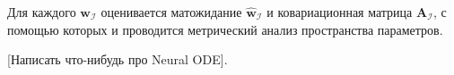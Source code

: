 \documentclass[12pt, twoside]{article}
\begin{document}
Для каждого $\mathbf{w}_{\mathcal{I}}$ оценивается матожидание $\hat{\mathbf{w}}_{\mathcal{I}}$ и ковариационная матрица $\mathbf{A}_{\mathcal{I}}$, с помощью которых и проводится метрический анализ пространства параметров.

[Написать что-нибудь про Neural ODE].


\end{document}
